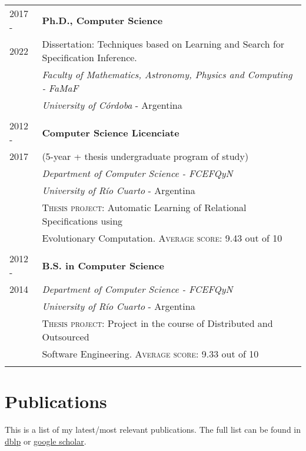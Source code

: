 \documentclass[a4paper,10pt]{article} %
\begin{document}
\begin{longtable}{ll}
\\
2017 - & \textbf{Ph.D., Computer Science} \\
2022 & Dissertation: Techniques based on Learning and Search for Specification Inference. \\
& \textit{Faculty of Mathematics, Astronomy, Physics and Computing - FaMaF} \\ & \textit{University of Córdoba} - Argentina \\ & \\

2012 - & \textbf{Computer Science Licenciate} \\
2017 & (5-year + thesis undergraduate program of study) \\
& \textit{Department of Computer Science - FCEFQyN} \\ & \textit{University of Río Cuarto} - Argentina \\ 
& \textsc{Thesis project:} Automatic Learning of Relational Specifications using \\ 
& Evolutionary Computation. \textsc{Average score:} 9.43 out of 10 \\ & \\

2012 -	& \textbf{B.S. in Computer Science} \\
2014 & \textit{Department of Computer Science - FCEFQyN} \\ 
& \textit{University of Río Cuarto} - Argentina \\
& \textsc{Thesis project:} Project in the course of Distributed and Outsourced \\ 
& Software Engineering. \textsc{Average score:} 9.33 out of 10 \\ \\ 

\end{longtable}

\section{Publications}

{\raggedleft
This is a list of my latest/most relevant publications. The full list can be found in \href{https://dblp.org/pid/189/6361.html}{dblp} or \href{https://scholar.google.com/citations?user=_8J_7doAAAAJ}{google scholar}.} \\
\end{document}
